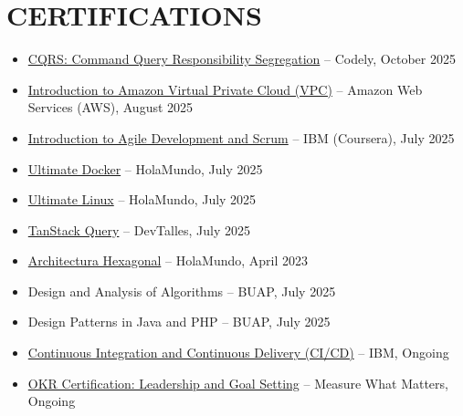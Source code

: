 \documentclass[a4paper,10pt]{article}
\begin{document}
\section*{CERTIFICATIONS}
\begin{itemize}[noitemsep, leftmargin=*]
    \item \href{https://www.linkedin.com/in/jose-carlos-huerta-garcia-773952212/details/certifications}{CQRS: Command Query Responsibility Segregation} -- Codely, October 2025
    \item \href{https://www.linkedin.com/in/jose-carlos-huerta-garcia-773952212/details/certifications}{Introduction to Amazon Virtual Private Cloud (VPC)} -- Amazon Web Services (AWS), August 2025
    \item \href{https://www.coursera.org/account/accomplishments/verify/D02Q5G7CT9H5}{Introduction to Agile Development and Scrum} -- IBM (Coursera), July 2025
    \item \href{https://academia.holamundo.io/certificates/fifvbfywmp}{Ultimate Docker} -- HolaMundo, July 2025
    \item \href{https://academia.holamundo.io/certificates/lsv1rybd6k}{Ultimate Linux} -- HolaMundo, July 2025
    \item \href{https://cursos.devtalles.com/certificates/80vdvpk0jq}{TanStack Query} -- DevTalles, July 2025
    \item \href{https://www.linkedin.com/in/jose-carlos-huerta-garcia-773952212/details/certifications/1758852008410/single-media-viewer/?profileId=ACoAADXjsscBqtjtdk4S_qpdkHwZsFn9y9TiG0o}{Architectura Hexagonal} -- HolaMundo, April 2023
    \item Design and Analysis of Algorithms -- BUAP, July 2025
    \item Design Patterns in Java and PHP -- BUAP, July 2025
    \item \href{https://www.coursera.org/programs/knu-high-o3k80/learn/continuous-integration-and-continuous-delivery-ci-cd?source=search}{Continuous Integration and Continuous Delivery (CI/CD)} -- IBM, Ongoing
    \item \href{https://www.coursera.org/learn/okr}{OKR Certification: Leadership and Goal Setting} -- Measure What Matters, Ongoing
\end{itemize}
\end{document}
